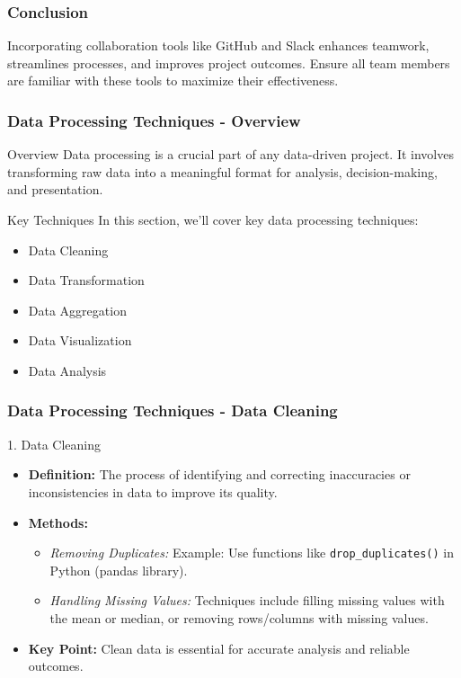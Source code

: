 \documentclass[aspectratio=169]{beamer}
\begin{document}
\begin{frame}[fragile]
    \frametitle{Conclusion}
    Incorporating collaboration tools like GitHub and Slack enhances teamwork, streamlines processes, and improves project outcomes. Ensure all team members are familiar with these tools to maximize their effectiveness.
\end{frame}

\begin{frame}[fragile]
    \frametitle{Data Processing Techniques - Overview}
    \begin{block}{Overview}
        Data processing is a crucial part of any data-driven project. It involves transforming raw data into a meaningful format for analysis, decision-making, and presentation. 
    \end{block}
    \begin{block}{Key Techniques}
        In this section, we'll cover key data processing techniques:
        \begin{itemize}
            \item Data Cleaning
            \item Data Transformation
            \item Data Aggregation
            \item Data Visualization
            \item Data Analysis
        \end{itemize}
    \end{block}
\end{frame}

\begin{frame}[fragile]
    \frametitle{Data Processing Techniques - Data Cleaning}
    \begin{block}{1. Data Cleaning}
        \begin{itemize}
            \item \textbf{Definition:} The process of identifying and correcting inaccuracies or inconsistencies in data to improve its quality.
            \item \textbf{Methods:}
                \begin{itemize}
                    \item \textit{Removing Duplicates:} Example: Use functions like \texttt{drop\_duplicates()} in Python (pandas library).
                    \item \textit{Handling Missing Values:} Techniques include filling missing values with the mean or median, or removing rows/columns with missing values.
                \end{itemize}
            \item \textbf{Key Point:} Clean data is essential for accurate analysis and reliable outcomes.
        \end{itemize}
    \end{block}
\end{frame}
\end{document}
